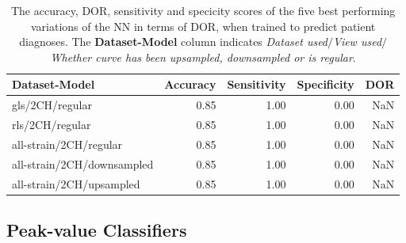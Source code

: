 \begin{table}
    \centering
    \begin{tabular}{lrrrr}
        \toprule
        Dataset-Model              &  Accuracy &  Sensitivity &  Specificity &  DOR \\
        \midrule
        gls/2CH/regular            &      0.85 &         1.00 &         0.00 &  NaN \\
        rls/2CH/regular            &      0.85 &         1.00 &         0.00 &  NaN \\
        all-strain/2CH/regular     &      0.85 &         1.00 &         0.00 &  NaN \\
        all-strain/2CH/downsampled &      0.85 &         1.00 &         0.00 &  NaN \\
        all-strain/2CH/upsampled   &      0.85 &         1.00 &         0.00 &  NaN \\
        \bottomrule
    \end{tabular}
    \caption{The accuracy, DOR, sensitivity and specicity scores of the five best performing variations of the NN in terms of DOR, when trained to predict patient diagnoses.
             The \textbf{Dataset-Model} column indicates \textit{Dataset used}$/$\textit{View used}$/$\textit{Whether curve has been upsampled, downsampled or is regular}.}
    \label{tab:dl_hf_dor_sens_spec_dist}
\end{table}

\newpage

\subsection{Peak-value Classifiers}


